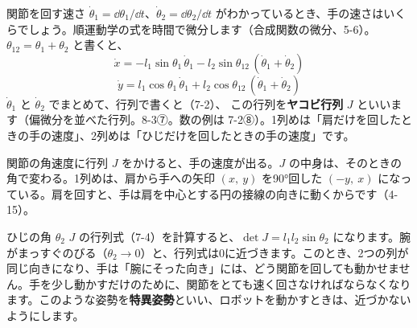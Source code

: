 関節を回す速さ $\dot\theta_1=\dd\theta_1/\dd t$、$\dot\theta_2=\dd\theta_2/\dd t$ がわかっているとき、手の速さはいくらでしょう。順運動学の式を時間で微分します（合成関数の微分、5-6）。$\theta_{12}=\theta_1+\theta_2$ と書くと、
\[\dot x=-l_1\sin\theta_1\,\dot\theta_1-l_2\sin\theta_{12}\,(\dot\theta_1+\dot\theta_2)\]
\[\dot y=l_1\cos\theta_1\,\dot\theta_1+l_2\cos\theta_{12}\,(\dot\theta_1+\dot\theta_2)\]
$\dot\theta_1$ と $\dot\theta_2$ でまとめて、行列で書くと（7-2）、
この行列を\textbf{ヤコビ行列} $J$ といいます（偏微分を並べた行列。8-3⑦。数の例は 7-2⑧）。1列めは「肩だけを回したときの手の速度」、2列めは「ひじだけを回したときの手の速度」です。
\begin{phyomi}[$\dot{\vec p}=J\dot{\vec\theta}$]
関節の角速度に行列 $J$ をかけると、手の速度が出る。$J$ の中身は、そのときの角で変わる。1列めは、肩から手への矢印 $(x,\ y)$ を\ang{90}回した $(-y,\ x)$ になっている。肩を回すと、手は肩を中心とする円の接線の向きに動くからです（4-15）。
\end{phyomi}
\begin{phbaisuru}[0]{ひじの角 $\theta_2$}
$J$ の行列式（7-4）を計算すると、$\det J=l_1l_2\sin\theta_2$ になります。腕がまっすぐのびる（$\theta_2\to0$）と、行列式は0に近づきます。このとき、2つの列が同じ向きになり、手は「腕にそった向き」には、どう関節を回しても動かせません。手を少し動かすだけのために、関節をとても速く回さなければならなくなります。このような姿勢を\textbf{特異姿勢}といい、ロボットを動かすときは、近づかないようにします。
\begin{bkcenter}
\end{bkcenter}
\end{phbaisuru}

